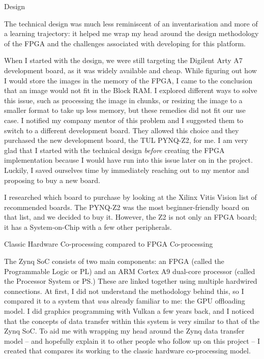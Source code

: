 \documentclass{matthijs}
\begin{document}
\begin{hoofdstuk}{Design}
		\clearpage

		\noindent The technical design was much less reminiscent of an inventarisation and more of a learning trajectory: it helped me wrap my head around the design methodology of the FPGA and the challenges associated with developing for this platform.

		When I started with the design, we were still targeting the Digilent Arty A7 development board, as it was widely available and cheap.
		While figuring out how I would store the images in the memory of the FPGA, I came to the conclusion that an image would not fit in the Block RAM.
		I explored different ways to solve this issue, such as processing the image in chunks, or resizing the image to a smaller format to take up less memory, but these remedies did not fit our use case.
		I notified my company mentor of this problem and I suggested them to switch to a different development board.
		They allowed this choice and they purchased the new development board, the TUL PYNQ-Z2, for me.
		I am very glad that I started with the technical design \textit{before} creating the FPGA implementation because I would have run into this issue later on in the project.
		Luckily, I saved ourselves time by immediately reaching out to my mentor and proposing to buy a new board.
		
		I researched which board to purchase by looking at the Xilinx Vitis Vision list of recommended boards.
		The PYNQ-Z2 was the most beginner-friendly board on that list, and we decided to buy it.
		However, the Z2 is not only an FPGA board; it has a System-on-Chip with a few other peripherals.

		\vspace{-0.6ex}
		\begin{figuur}{Classic Hardware Co-processing compared to FPGA Co-processing}
			\singlespacing
			\onehalfspacing
		\end{figuur}
		\vspace{-0.2ex}

		\noindent The Zynq SoC consists of two main components: an FPGA (called the Programmable Logic or PL) and an ARM Cortex A9 dual-core processor (called the Processor System or PS.)
		These are linked together using multiple hardwired connections.
		At first, I did not understand the methodology behind this, so I compared it to a system that \textit{was} already familiar to me: the GPU offloading model.
		I did graphics programming with Vulkan a few years back, and I noticed that the concepts of data transfer within this system is very similar to that of the Zynq SoC.
		To aid me with wrapping my head around the Zynq data transfer model -- and hopefully explain it to other people who follow up on this project -- I created  that compares its working to the classic hardware co-processing model.


\end{hoofdstuk}
\end{document}
